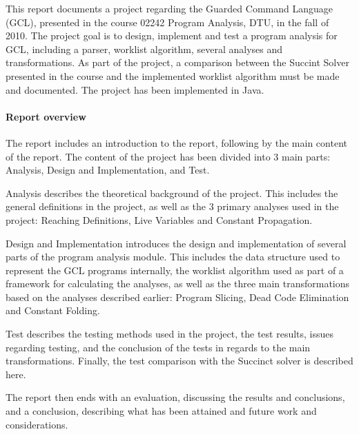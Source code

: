 This report documents a project regarding the
Guarded Command Language (GCL), presented in the course 02242
Program Analysis, DTU, in the fall of 2010.
The project goal is to design, implement and test
a program analysis for GCL, including a parser,
worklist algorithm, several analyses and transformations.
As part of the project, a comparison between the Succint Solver
presented in the course and the implemented worklist algorithm
must be made and documented.
The project has been implemented in Java.

\paragraph{Report overview}

The report includes an introduction to the report, following by the main
content of the report. The content of the project has been divided into
3 main parts: Analysis, Design and Implementation, and Test.

Analysis describes the theoretical background
of the project. This includes the general definitions in
the project, as well as the 3 primary analyses used in
the project: Reaching Definitions, Live Variables and
Constant Propagation.

Design and Implementation introduces the design
and implementation of several parts of the program
analysis module. This includes the data structure used to
represent the GCL programs internally, the worklist algorithm
used as part of a framework for calculating the analyses,
as well as the three main transformations based on
the analyses described earlier: Program Slicing,
Dead Code Elimination and Constant Folding.

Test describes the testing methods used in
the project, the test results, issues regarding testing,
and the conclusion of the tests in regards to the
main transformations. Finally, the test comparison
with the Succinct solver is described here.

The report then ends with an evaluation, discussing the
results and conclusions, and a conclusion, describing
what has been attained and future work and considerations.

